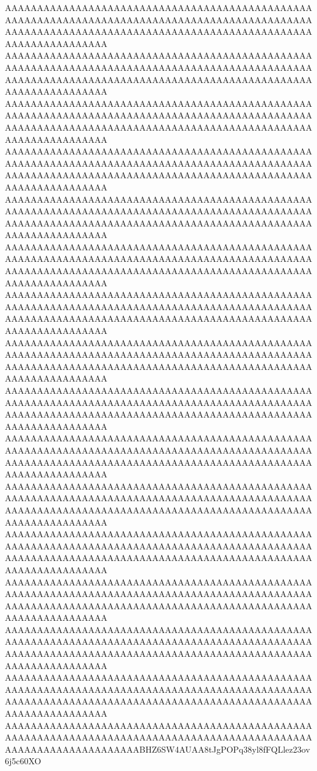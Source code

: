 \documentclass[multi=frame]{standalone}
\begin{document}
\begin{world}
        AAAAAAAAAAAAAAAAAAAAAAAAAAAAAAAAAAAAAAAAAAAAAAAAAAAAAAAAAAAAAAAAAAAAAAAAAAAAAAAAAAAAAAAAAAAAAAAAAAAAAAAAAAAAAAAAAAAAAAAAAAAAAAAAAAAAAAAAAAAAAAAAAAAAAAAAAAAAAAAA
        AAAAAAAAAAAAAAAAAAAAAAAAAAAAAAAAAAAAAAAAAAAAAAAAAAAAAAAAAAAAAAAAAAAAAAAAAAAAAAAAAAAAAAAAAAAAAAAAAAAAAAAAAAAAAAAAAAAAAAAAAAAAAAAAAAAAAAAAAAAAAAAAAAAAAAAAAAAAAAAA
        AAAAAAAAAAAAAAAAAAAAAAAAAAAAAAAAAAAAAAAAAAAAAAAAAAAAAAAAAAAAAAAAAAAAAAAAAAAAAAAAAAAAAAAAAAAAAAAAAAAAAAAAAAAAAAAAAAAAAAAAAAAAAAAAAAAAAAAAAAAAAAAAAAAAAAAAAAAAAAAA
        AAAAAAAAAAAAAAAAAAAAAAAAAAAAAAAAAAAAAAAAAAAAAAAAAAAAAAAAAAAAAAAAAAAAAAAAAAAAAAAAAAAAAAAAAAAAAAAAAAAAAAAAAAAAAAAAAAAAAAAAAAAAAAAAAAAAAAAAAAAAAAAAAAAAAAAAAAAAAAAA
        AAAAAAAAAAAAAAAAAAAAAAAAAAAAAAAAAAAAAAAAAAAAAAAAAAAAAAAAAAAAAAAAAAAAAAAAAAAAAAAAAAAAAAAAAAAAAAAAAAAAAAAAAAAAAAAAAAAAAAAAAAAAAAAAAAAAAAAAAAAAAAAAAAAAAAAAAAAAAAAA
        AAAAAAAAAAAAAAAAAAAAAAAAAAAAAAAAAAAAAAAAAAAAAAAAAAAAAAAAAAAAAAAAAAAAAAAAAAAAAAAAAAAAAAAAAAAAAAAAAAAAAAAAAAAAAAAAAAAAAAAAAAAAAAAAAAAAAAAAAAAAAAAAAAAAAAAAAAAAAAAA
        AAAAAAAAAAAAAAAAAAAAAAAAAAAAAAAAAAAAAAAAAAAAAAAAAAAAAAAAAAAAAAAAAAAAAAAAAAAAAAAAAAAAAAAAAAAAAAAAAAAAAAAAAAAAAAAAAAAAAAAAAAAAAAAAAAAAAAAAAAAAAAAAAAAAAAAAAAAAAAAA
        AAAAAAAAAAAAAAAAAAAAAAAAAAAAAAAAAAAAAAAAAAAAAAAAAAAAAAAAAAAAAAAAAAAAAAAAAAAAAAAAAAAAAAAAAAAAAAAAAAAAAAAAAAAAAAAAAAAAAAAAAAAAAAAAAAAAAAAAAAAAAAAAAAAAAAAAAAAAAAAA
        AAAAAAAAAAAAAAAAAAAAAAAAAAAAAAAAAAAAAAAAAAAAAAAAAAAAAAAAAAAAAAAAAAAAAAAAAAAAAAAAAAAAAAAAAAAAAAAAAAAAAAAAAAAAAAAAAAAAAAAAAAAAAAAAAAAAAAAAAAAAAAAAAAAAAAAAAAAAAAAA
        AAAAAAAAAAAAAAAAAAAAAAAAAAAAAAAAAAAAAAAAAAAAAAAAAAAAAAAAAAAAAAAAAAAAAAAAAAAAAAAAAAAAAAAAAAAAAAAAAAAAAAAAAAAAAAAAAAAAAAAAAAAAAAAAAAAAAAAAAAAAAAAAAAAAAAAAAAAAAAAA
        AAAAAAAAAAAAAAAAAAAAAAAAAAAAAAAAAAAAAAAAAAAAAAAAAAAAAAAAAAAAAAAAAAAAAAAAAAAAAAAAAAAAAAAAAAAAAAAAAAAAAAAAAAAAAAAAAAAAAAAAAAAAAAAAAAAAAAAAAAAAAAAAAAAAAAAAAAAAAAAA
        AAAAAAAAAAAAAAAAAAAAAAAAAAAAAAAAAAAAAAAAAAAAAAAAAAAAAAAAAAAAAAAAAAAAAAAAAAAAAAAAAAAAAAAAAAAAAAAAAAAAAAAAAAAAAAAAAAAAAAAAAAAAAAAAAAAAAAAAAAAAAAAAAAAAAAAAAAAAAAAA
        AAAAAAAAAAAAAAAAAAAAAAAAAAAAAAAAAAAAAAAAAAAAAAAAAAAAAAAAAAAAAAAAAAAAAAAAAAAAAAAAAAAAAAAAAAAAAAAAAAAAAAAAAAAAAAAAAAAAAAAAAAAAAAAAAAAAAAAAAAAAAAAAAAAAAAAAAAAAAAAA
        AAAAAAAAAAAAAAAAAAAAAAAAAAAAAAAAAAAAAAAAAAAAAAAAAAAAAAAAAAAAAAAAAAAAAAAAAAAAAAAAAAAAAAAAAAAAAAAAAAAAAAAAAAAAAAAAAAAAAAAAAAAAAAAAAAAAAAAAAAAAAAAAAAAAAAAAAAAAAAAA
        AAAAAAAAAAAAAAAAAAAAAAAAAAAAAAAAAAAAAAAAAAAAAAAAAAAAAAAAAAAAAAAAAAAAAAAAAAAAAAAAAAAAAAAAAAAAAAAAAAAAAAAAAAAAAAAAAAAAAAAAAAAAAAAAAAAAAAAAAAAAAAAAAAAAAAAAAAAAAAAA
        AAAAAAAAAAAAAAAAAAAAAAAAAAAAAAAAAAAAAAAAAAAAAAAAAAAAAAAAAAAAAAAAAAAAAAAAAAAAAAAAAAAAAAAAAAAAAAAAAAAAAAAAAAAAAAAAAAAAABHZ6SW4AUAA8tJgPOPq38yl8fFQLlez23ov6j5c60XO

\end{world}
\end{document}
